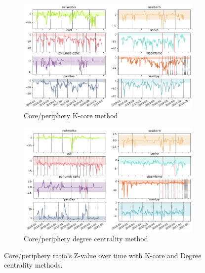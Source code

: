 \begin{figure}[!htbp]
    \centering
    \begin{subfigure}{0.99\textwidth}
        \centering
        \includegraphics[width=0.99\textwidth]{figures/qualitative/core_periphery/core_periphery_k_core.png}
        \caption{Core/periphery K-core method}
        \label{fig:cp-k-core}
    \end{subfigure}
    \begin{subfigure}{0.99\textwidth}
        \centering
        \includegraphics[width=0.99\textwidth]{figures/qualitative/core_periphery/core_periphery_degree.png}
        \caption{Core/periphery degree centrality method}
        \label{fig:cp-degree-centrality}
    \end{subfigure}
    \caption{Core/periphery ratio's Z-value over time with K-core and Degree centrality methods.}
    \label{fig:core-periphery}

\end{figure}


